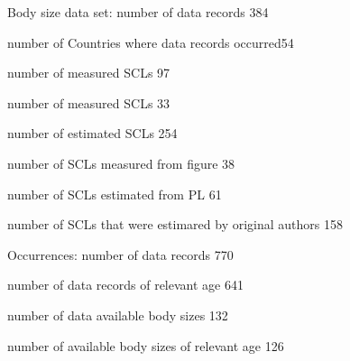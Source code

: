 \documentclass[]{article}
\begin{document}
Body size data set: number of data records 384

number of Countries where data records occurred54

number of measured SCLs 97

number of measured SCLs 33

number of estimated SCLs 254

number of SCLs measured from figure 38

number of SCLs estimated from PL 61

number of SCLs that were estimared by original authors 158

Occurrences: number of data records 770

number of data records of relevant age 641

number of data available body sizes 132

number of available body sizes of relevant age 126
\end{document}
